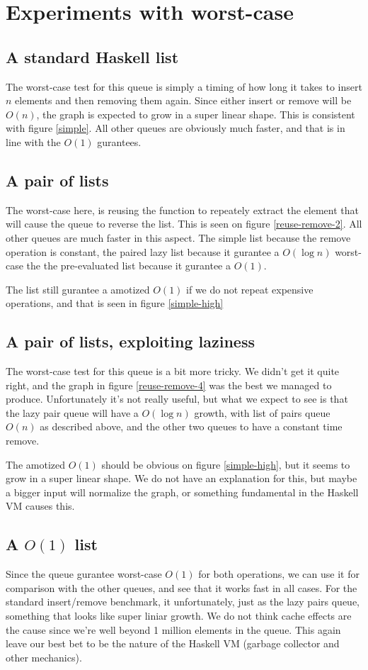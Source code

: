 \section*{Experiments with worst-case}

\subsection*{A standard Haskell list}
The worst-case test for this queue is simply a timing of how long it takes to insert $n$ elements and then removing them again. Since either insert or remove will be $O(n)$, the graph is expected to grow in a super linear shape. This is consistent with figure \ref{simple}. All other queues are obviously much faster, and that is in line with the $O(1)$ gurantees.

\subsection*{A pair of lists}
The worst-case here, is reusing the function to repeately extract the element that will cause the queue to reverse the list. This is seen on figure \ref{reuse-remove-2}. All other queues are much faster in this aspect. The simple list because the remove operation is constant, the paired lazy list because it gurantee a $O(\log n)$ worst-case the the pre-evaluated list because it gurantee a $O(1)$.

The list still gurantee a amotized $O(1)$ if we do not repeat expensive operations, and that is seen in figure \ref{simple-high}

\subsection*{A pair of lists, exploiting laziness}
The worst-case test for this queue is a bit more tricky. We didn't get it quite right, and the graph in figure \ref{reuse-remove-4} was the best we managed to produce. Unfortunately it's not really useful, but what we expect to see is that the lazy pair queue will have a $O(\log n)$ growth, with list of pairs queue $O(n)$ as described above, and the other two queues to have a constant time remove.

The amotized $O(1)$ should be obvious on figure \ref{simple-high}, but it seems to grow in a super linear shape. We do not have an explanation for this, but maybe a bigger input will normalize the graph, or something fundamental in the Haskell VM causes this.

\subsection*{A $O(1)$ list}
Since the queue gurantee worst-case $O(1)$ for both operations, we can use it for comparison with the other queues, and see that it works fast in all cases. For the standard insert/remove benchmark, it unfortunately, just as the lazy pairs queue, something that looks like super liniar growth. We do not think cache effects are the cause since we're well beyond 1 million elements in the queue. This again leave our best bet to be the nature of the Haskell VM (garbage collector and other mechanics).


